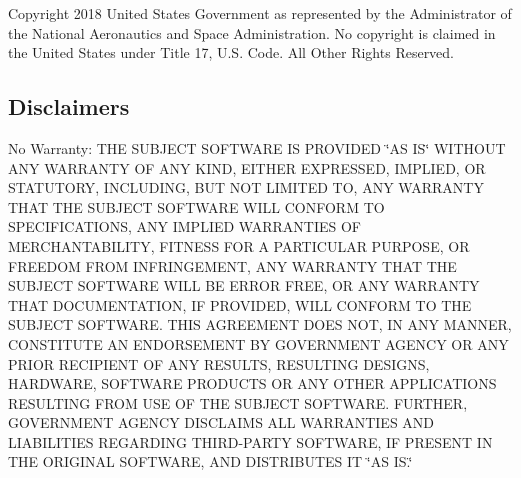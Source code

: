 Copyright 2018 United States Government as represented by the Administrator of the National Aeronautics and Space Administration. No copyright is claimed in the United States under Title 17, U.\+S. Code. All Other Rights Reserved.

\subsection*{Disclaimers}

No Warranty\+: T\+HE S\+U\+B\+J\+E\+CT S\+O\+F\+T\+W\+A\+RE IS P\+R\+O\+V\+I\+D\+ED \char`\"{}\+A\+S I\+S\char`\"{} W\+I\+T\+H\+O\+UT A\+NY W\+A\+R\+R\+A\+N\+TY OF A\+NY K\+I\+ND, E\+I\+T\+H\+ER E\+X\+P\+R\+E\+S\+S\+ED, I\+M\+P\+L\+I\+ED, OR S\+T\+A\+T\+U\+T\+O\+RY, I\+N\+C\+L\+U\+D\+I\+NG, B\+UT N\+OT L\+I\+M\+I\+T\+ED TO, A\+NY W\+A\+R\+R\+A\+N\+TY T\+H\+AT T\+HE S\+U\+B\+J\+E\+CT S\+O\+F\+T\+W\+A\+RE W\+I\+LL C\+O\+N\+F\+O\+RM TO S\+P\+E\+C\+I\+F\+I\+C\+A\+T\+I\+O\+NS, A\+NY I\+M\+P\+L\+I\+ED W\+A\+R\+R\+A\+N\+T\+I\+ES OF M\+E\+R\+C\+H\+A\+N\+T\+A\+B\+I\+L\+I\+TY, F\+I\+T\+N\+E\+SS F\+OR A P\+A\+R\+T\+I\+C\+U\+L\+AR P\+U\+R\+P\+O\+SE, OR F\+R\+E\+E\+D\+OM F\+R\+OM I\+N\+F\+R\+I\+N\+G\+E\+M\+E\+NT, A\+NY W\+A\+R\+R\+A\+N\+TY T\+H\+AT T\+HE S\+U\+B\+J\+E\+CT S\+O\+F\+T\+W\+A\+RE W\+I\+LL BE E\+R\+R\+OR F\+R\+EE, OR A\+NY W\+A\+R\+R\+A\+N\+TY T\+H\+AT D\+O\+C\+U\+M\+E\+N\+T\+A\+T\+I\+ON, IF P\+R\+O\+V\+I\+D\+ED, W\+I\+LL C\+O\+N\+F\+O\+RM TO T\+HE S\+U\+B\+J\+E\+CT S\+O\+F\+T\+W\+A\+RE. T\+H\+IS A\+G\+R\+E\+E\+M\+E\+NT D\+O\+ES N\+OT, IN A\+NY M\+A\+N\+N\+ER, C\+O\+N\+S\+T\+I\+T\+U\+TE AN E\+N\+D\+O\+R\+S\+E\+M\+E\+NT BY G\+O\+V\+E\+R\+N\+M\+E\+NT A\+G\+E\+N\+CY OR A\+NY P\+R\+I\+OR R\+E\+C\+I\+P\+I\+E\+NT OF A\+NY R\+E\+S\+U\+L\+TS, R\+E\+S\+U\+L\+T\+I\+NG D\+E\+S\+I\+G\+NS, H\+A\+R\+D\+W\+A\+RE, S\+O\+F\+T\+W\+A\+RE P\+R\+O\+D\+U\+C\+TS OR A\+NY O\+T\+H\+ER A\+P\+P\+L\+I\+C\+A\+T\+I\+O\+NS R\+E\+S\+U\+L\+T\+I\+NG F\+R\+OM U\+SE OF T\+HE S\+U\+B\+J\+E\+CT S\+O\+F\+T\+W\+A\+RE. F\+U\+R\+T\+H\+ER, G\+O\+V\+E\+R\+N\+M\+E\+NT A\+G\+E\+N\+CY D\+I\+S\+C\+L\+A\+I\+MS A\+LL W\+A\+R\+R\+A\+N\+T\+I\+ES A\+ND L\+I\+A\+B\+I\+L\+I\+T\+I\+ES R\+E\+G\+A\+R\+D\+I\+NG T\+H\+I\+R\+D-\/\+P\+A\+R\+TY S\+O\+F\+T\+W\+A\+RE, IF P\+R\+E\+S\+E\+NT IN T\+HE O\+R\+I\+G\+I\+N\+AL S\+O\+F\+T\+W\+A\+RE, A\+ND D\+I\+S\+T\+R\+I\+B\+U\+T\+ES IT \char`\"{}\+A\+S I\+S.\char`\"{} 

